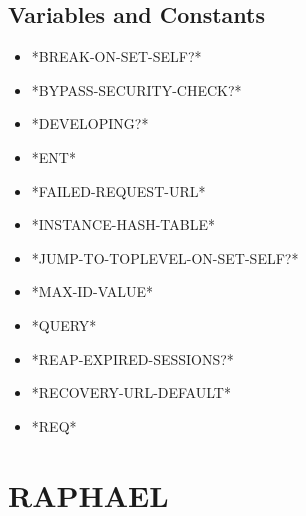 \documentclass [11pt]{book}
\begin{document}
\subsection{Variables and Constants}

\label{subsec:variablesandconstants}



\begin{itemize}

\item {}*BREAK-ON-SET-SELF?*

\item {}*BYPASS-SECURITY-CHECK?*

\item {}*DEVELOPING?*

\item {}*ENT*

\item {}*FAILED-REQUEST-URL*

\item {}*INSTANCE-HASH-TABLE*

\item {}*JUMP-TO-TOPLEVEL-ON-SET-SELF?*

\item {}*MAX-ID-VALUE*

\item {}*QUERY*

\item {}*REAP-EXPIRED-SESSIONS?*

\item {}*RECOVERY-URL-DEFAULT*

\item {}*REQ*

\end{itemize}





\section{RAPHAEL }

\label{sec:raphael}
\end{document}

